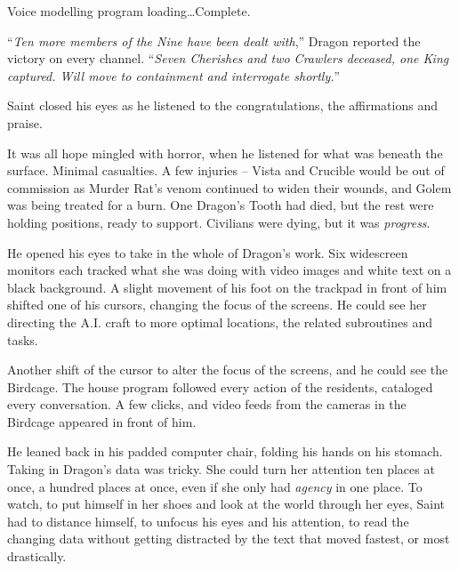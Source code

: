 Voice modelling program loading\ldots Complete.



``\emph{Ten more members of the Nine have been dealt with},'' Dragon reported the victory on every channel.  ``\emph{Seven Cherishes and two Crawlers deceased, one King captured.  Will move to containment and interrogate shortly.}''



\sectionbreak



Saint closed his eyes as he listened to the congratulations, the affirmations and praise.



It was all hope mingled with horror, when he listened for what was beneath the surface.  Minimal casualties.  A few injuries – Vista and Crucible would be out of commission as Murder Rat's venom continued to widen their wounds, and Golem was being treated for a burn.  One Dragon's Tooth had died, but the rest were holding positions, ready to support.  Civilians were dying, but it was \emph{progress}.



He opened his eyes to take in the whole of Dragon's work.  Six widescreen monitors each tracked what she was doing with video images and white text on a black background.  A slight movement of his foot on the trackpad in front of him shifted one of his cursors, changing the focus of the screens.  He could see her directing the A.I. craft to more optimal locations, the related subroutines and tasks.



Another shift of the cursor to alter the focus of the screens, and he could see the Birdcage.  The house program followed every action of the residents, cataloged every conversation.  A few clicks, and video feeds from the cameras in the Birdcage appeared in front of him.



He leaned back in his padded computer chair, folding his hands on his stomach.  Taking in Dragon's data was tricky.  She could turn her attention ten places at once, a hundred places at once, even if she only had \emph{agency} in one place.  To watch, to put himself in her shoes and look at the world through her eyes, Saint had to distance himself, to unfocus his eyes and his attention, to read the changing data without getting distracted by the text that moved fastest, or most drastically.



